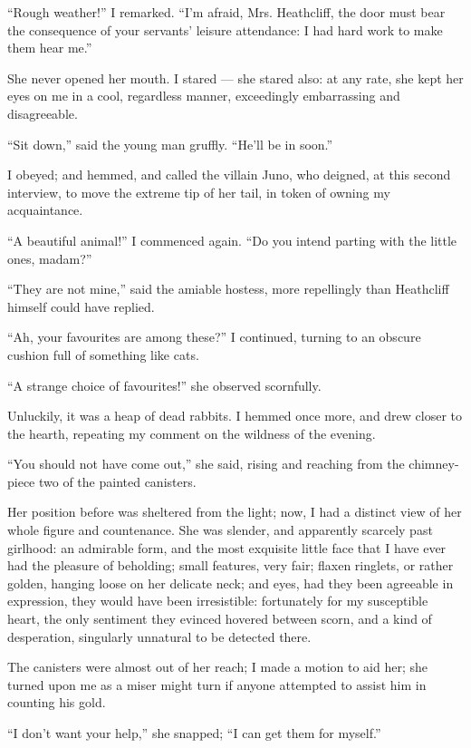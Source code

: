 \par “Rough weather!” I remarked. “I'm afraid, Mrs. Heathcliff, the door must bear the consequence of your servants' leisure attendance: I had hard work to make them hear me.”
\par She never opened her mouth. I stared — she stared also: at any rate, she kept her eyes on me in a cool, regardless manner, exceedingly embarrassing and disagreeable.
\par “Sit down,” said the young man gruffly. “He'll be in soon.”
\par I obeyed; and hemmed, and called the villain Juno, who deigned, at this second interview, to move the extreme tip of her tail, in token of owning my acquaintance.
\par “A beautiful animal!” I commenced again. “Do you intend parting with the little ones, madam?”
\par “They are not mine,” said the amiable hostess, more repellingly than Heathcliff himself could have replied.
\par “Ah, your favourites are among these?” I continued, turning to an obscure cushion full of something like cats.
\par “A strange choice of favourites!” she observed scornfully.
\par Unluckily, it was a heap of dead rabbits. I hemmed once more, and drew closer to the hearth, repeating my comment on the wildness of the evening.
\par “You should not have come out,” she said, rising and reaching from the chimney-piece two of the painted canisters.
\par Her position before was sheltered from the light; now, I had a distinct view of her whole figure and countenance. She was slender, and apparently scarcely past girlhood: an admirable form, and the most exquisite little face that I have ever had the pleasure of beholding; small features, very fair; flaxen ringlets, or rather golden, hanging loose on her delicate neck; and eyes, had they been agreeable in expression, they would have been irresistible: fortunately for my susceptible heart, the only sentiment they evinced hovered between scorn, and a kind of desperation, singularly unnatural to be detected there.
\par The canisters were almost out of her reach; I made a motion to aid her; she turned upon me as a miser might turn if anyone attempted to assist him in counting his gold.
\par “I don't want your help,” she snapped; “I can get them for myself.”
